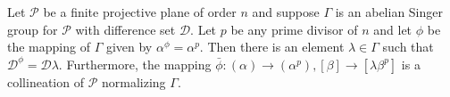Let $\mathcal{P}$ be a finite projective plane of order $n$ and suppose $\Gamma$ is an abelian Singer group for $\mathcal{P}$ with difference set $\mathcal{D}$. Let $p$ be any prime divisor of $n$ and let $\phi$ be the mapping of $\Gamma$ given by $\alpha^\phi = \alpha^p$. Then there is an element $\lambda \in \Gamma$ such that $\mathcal{D}^\phi = \mathcal{D}\lambda$. Furthermore, the mapping $\bar{\phi}: (\alpha) \to (\alpha^p), [\beta] \to [\lambda \beta^p]$ is a collineation of $\mathcal{P}$ normalizing $\Gamma$.
